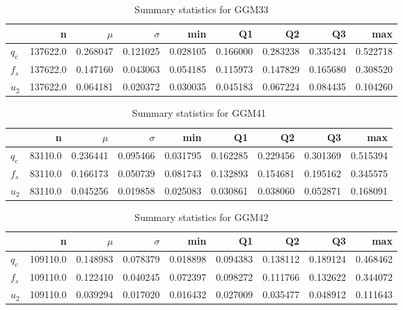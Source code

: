 \begin{table}[h]
\caption{Summary statistics for GGM33}
\begin{tabular}{lrrrrrrrr}
\toprule
{} &         n &     $\mu$ &  $\sigma$ &       min &        Q1 &        Q2 &        Q3 &       max \\
\midrule
$q_c$ &  137622.0 &  0.268047 &  0.121025 &  0.028105 &  0.166000 &  0.283238 &  0.335424 &  0.522718 \\
$f_s$ &  137622.0 &  0.147160 &  0.043063 &  0.054185 &  0.115973 &  0.147829 &  0.165680 &  0.308520 \\
$u_2$ &  137622.0 &  0.064181 &  0.020372 &  0.030035 &  0.045183 &  0.067224 &  0.084435 &  0.104260 \\
\bottomrule
\end{tabular}
\end{table}

\begin{table}[h]
\caption{Summary statistics for GGM41}
\begin{tabular}{lrrrrrrrr}
\toprule
{} &        n &     $\mu$ &  $\sigma$ &       min &        Q1 &        Q2 &        Q3 &       max \\
\midrule
$q_c$ &  83110.0 &  0.236441 &  0.095466 &  0.031795 &  0.162285 &  0.229456 &  0.301369 &  0.515394 \\
$f_s$ &  83110.0 &  0.166173 &  0.050739 &  0.081743 &  0.132893 &  0.154681 &  0.195162 &  0.345575 \\
$u_2$ &  83110.0 &  0.045256 &  0.019858 &  0.025083 &  0.030861 &  0.038060 &  0.052871 &  0.168091 \\
\bottomrule
\end{tabular}
\end{table}

\begin{table}[h]
\caption{Summary statistics for GGM42}
\begin{tabular}{lrrrrrrrr}
\toprule
{} &         n &     $\mu$ &  $\sigma$ &       min &        Q1 &        Q2 &        Q3 &       max \\
\midrule
$q_c$ &  109110.0 &  0.148983 &  0.078379 &  0.018898 &  0.094383 &  0.138112 &  0.189124 &  0.468462 \\
$f_s$ &  109110.0 &  0.122410 &  0.040245 &  0.072397 &  0.098272 &  0.111766 &  0.132622 &  0.344072 \\
$u_2$ &  109110.0 &  0.039294 &  0.017020 &  0.016432 &  0.027009 &  0.035477 &  0.048912 &  0.111643 \\
\bottomrule
\end{tabular}
\end{table}

